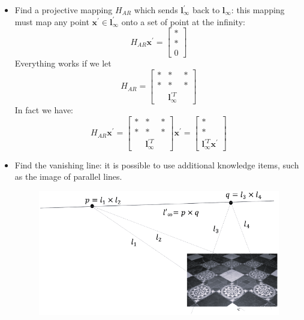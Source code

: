 \documentclass[12pt, a4paper]{report}
\begin{document}
    \begin{itemize}
        \item Find a projective mapping $H_{AR}$ which sends $\boldsymbol{l}^{'}_{\infty}$ back to $\boldsymbol{l}_{\infty}$: this mapping 
            must map any point $\boldsymbol{x}^{'} \in \boldsymbol{l}^{'}_{\infty}$ onto a set of point at the infinity: 
            \[H_{AR}\boldsymbol{x}^{'} = \begin{bmatrix} * \\ * \\ 0 \end{bmatrix}\]
            Everything works if we let \[H_{AR}=
            \begin{bmatrix}
                * & * & * \\
                * & * & * \\
                \: & \boldsymbol{l}^{'T}_{\infty} & \:
            \end{bmatrix}\]
            In fact we have: 
            \[H_{AR}\boldsymbol{x}^{'}=
            \begin{bmatrix}
                * & * & * \\
                * & * & * \\
                \: & \boldsymbol{l}^{'T}_{\infty} & \:
            \end{bmatrix}
            \boldsymbol{x}^{'}
            =
            \begin{bmatrix}
                * \\
                * \\
                \boldsymbol{l}^{'T}_{\infty}\boldsymbol{x}^{'}
            \end{bmatrix}
            \]
        \item Find the vanishing line: it is possible to use additional knowledge items, such as the image of parallel lines. 
            \begin{figure}[H]
                \centering
                \includegraphics[width=0.5\linewidth]{images/van.png}
            \end{figure}
    \end{itemize}
\end{document}
